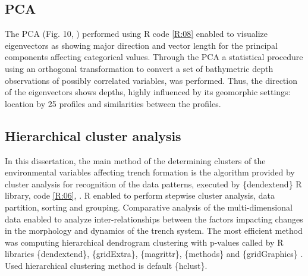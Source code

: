 \documentclass[11pt,a4paper]{report}
\begin{document}
{%
\subsection{\ac{PCA}}\label{ssec:PCA}
The \ac{PCA} (Fig. 10, \cite{Lemenkova201871}) performed using R code \ref{R:08} enabled to visualize eigenvectors as showing major direction and vector length for the principal components affecting categorical values. Through the \ac{PCA} a statistical procedure using an orthogonal transformation to convert a set of bathymetric depth observations of possibly correlated variables, was performed. Thus, the direction of the eigenvectors shows depths, highly influenced by its geomorphic settings: location by 25 profiles and similarities between the profiles.

\subsection{Hierarchical cluster analysis}\label{ssec:HCA}
In this dissertation, the main method of the determining clusters of the environmental variables affecting trench formation is the algorithm provided by cluster analysis for recognition of the data patterns, executed by \{dendextend\} R library, code \ref{R:06}, \cite{Lemenkova202007}. R enabled to  perform stepwise cluster analysis, data partition, sorting and grouping. Comparative analysis of the multi-dimensional data enabled to analyze inter-relationships between the factors impacting changes in the morphology and dynamics of the trench system. The most efficient method was computing hierarchical dendrogram clustering with p-values called by R libraries \{dendextend\}, \{gridExtra\}, \{magrittr\}, \{methods\} and \{gridGraphics\} \cite{Lemenkova202007}. Used hierarchical clustering method is default \{hclust\}. 

}
\end{document}
